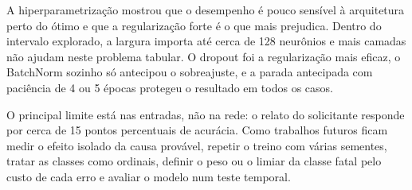 A hiperparametrização mostrou que o desempenho é pouco sensível à arquitetura perto do ótimo e que a regularização forte é o que mais prejudica. Dentro do intervalo explorado, a largura importa até cerca de 128 neurônios e mais camadas não ajudam neste problema tabular. O dropout foi a regularização mais eficaz, o BatchNorm sozinho só antecipou o sobreajuste, e a parada antecipada com paciência de 4 ou 5 épocas protegeu o resultado em todos os casos.

O principal limite está nas entradas, não na rede: o relato do solicitante responde por cerca de 15 pontos percentuais de acurácia. Como trabalhos futuros ficam medir o efeito isolado da causa provável, repetir o treino com várias sementes, tratar as classes como ordinais, definir o peso ou o limiar da classe fatal pelo custo de cada erro e avaliar o modelo num teste temporal.
